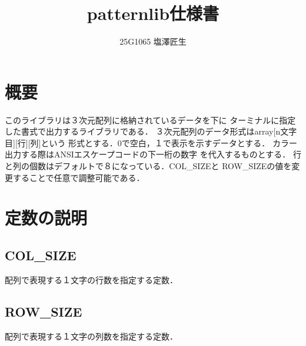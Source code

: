 \documentclass[uplatex]{jsarticle}
\begin{document}
\title{patternlib仕様書}
\author{25G1065 塩澤匠生}

\maketitle


\section{概要}
このライブラリは３次元配列に格納されているデータを下に
ターミナルに指定した書式で出力するライブラリである．
３次元配列のデータ形式はarray[n文字目][行][列]という
形式とする．0で空白，１で表示を示すデータとする．
カラー出力する際はANSIエスケープコードの下一桁の数字
を代入するものとする．
行と列の個数はデフォルトで８になっている．COL_SIZEと
ROW_SIZEの値を変更することで任意で調整可能である．

\section{定数の説明}
\subsection{COL_SIZE}
配列で表現する１文字の行数を指定する定数．
\subsection{ROW_SIZE}
配列で表現する１文字の列数を指定する定数．
\end{document}
